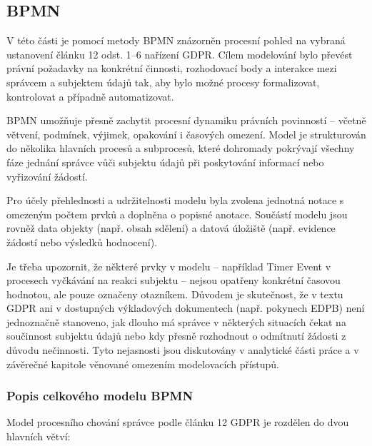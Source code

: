 
\subsection{BPMN}
\label{sec:bpmn}
V této části je pomocí metody BPMN znázorněn procesní pohled na vybraná ustanovení článku 12 odst. 1–6 nařízení GDPR. Cílem modelování bylo převést právní požadavky na konkrétní činnosti, rozhodovací body a interakce mezi správcem a subjektem údajů tak, aby bylo možné procesy formalizovat, kontrolovat a případně automatizovat.

BPMN umožňuje přesně zachytit procesní dynamiku právních povinností – včetně větvení, podmínek, výjimek, opakování i časových omezení. Model je strukturován do několika hlavních procesů a subprocesů, které dohromady pokrývají všechny fáze jednání správce vůči subjektu údajů při poskytování informací nebo vyřizování žádostí.

Pro účely přehlednosti a udržitelnosti modelu byla zvolena jednotná notace s omezeným počtem prvků a doplněna o popisné anotace. Součástí modelu jsou rovněž data objekty (např. obsah sdělení) a datová úložiště (např. evidence žádostí nebo výsledků hodnocení).

Je třeba upozornit, že některé prvky v modelu – například Timer Event v procesech vyčkávání na reakci subjektu – nejsou opatřeny konkrétní časovou hodnotou, ale pouze označeny otazníkem. Důvodem je skutečnost, že v textu GDPR ani v dostupných výkladových dokumentech (např. pokynech EDPB) není jednoznačně stanoveno, jak dlouho má správce v některých situacích čekat na součinnost subjektu údajů nebo kdy přesně rozhodnout o odmítnutí žádosti z důvodu nečinnosti. Tyto nejasnosti jsou diskutovány v analytické části práce a v závěrečné kapitole věnované omezením modelovacích přístupů.


\subsubsection{Popis celkového modelu BPMN}
\label{sec:bpmn-popis-modelu}

Model procesního chování správce podle článku 12 GDPR je rozdělen do dvou hlavních větví:

